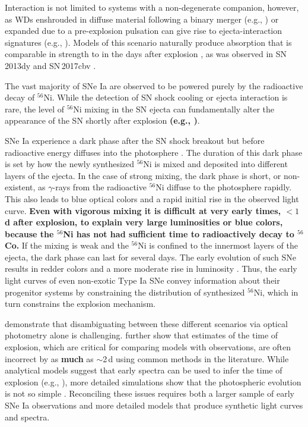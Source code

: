 \documentclass[twocolumn]{aastex61}
\begin{document}
Interaction is not limited to systems with a non-degenerate companion,
however, as WDs enshrouded in diffuse material following a binary merger
(e.g., \citealt{2015MNRAS.447.2803L}) or expanded due to a pre-explosion
pulsation can give rise to ejecta-interaction signatures (e.g.,
\citealt{2014MNRAS.441..532D}). Models of this scenario naturally produce
 absorption that is comparable in strength to  in the
days after explosion \citep{2014MNRAS.441..532D}, as was observed in
SN\,2013dy \citep{2013ApJ...778L..15Z} and SN\,2017cbv
\citep{2017ApJ...845L..11H}.

The vast majority of SNe Ia are observed to be powered purely by the
radioactive decay of $^{56}$Ni. While the detection of SN shock cooling or
ejecta interaction is rare, the level of $^{56}$Ni mixing in the SN ejecta can
fundamentally alter the appearance of the SN shortly after explosion
\textbf{(e.g.,
\citealt{2014MNRAS.441..532D,2016ApJ...826...96P,2017MNRAS.466.3784S,2017MNRAS.472.2787N})}. 

SNe Ia experience a dark phase after the SN shock breakout but before
radioactive energy diffuses into the photosphere \citep{2014ApJ...784...85P}.
The duration of this dark phase is set by how the newly synthesized $^{56}$Ni
is mixed and deposited into different layers of the ejecta. In the case of
strong mixing, the dark phase is short, or non-existent, as $\gamma$-rays from
the radioactive $^{56}$Ni diffuse to the photosphere rapidly. This also leads
to blue optical colors and a rapid initial rise in the observed light curve.
\textbf{Even with vigorous mixing it is difficult at very early times, $<
1$\,d after explosion, to explain very large luminosities or blue colors,
because the $^{56}$Ni has not had sufficient time to radioactively decay to
$^{56}$Co.} If the mixing is weak and the $^{56}$Ni is confined to the
innermost layers of the ejecta, the dark phase can last for several days. The
early evolution of such SNe results in redder colors and a more moderate rise
in luminosity \citep{2014MNRAS.441..532D,2016ApJ...826...96P}. Thus, the early
light curves of even non-exotic Type Ia SNe convey information about their
progenitor systems by constraining the distribution of synthesized $^{56}$Ni,
which in turn constrains the explosion mechanism.


\citet{2017MNRAS.472.2787N} demonstrate that disambiguating between these different scenarios via optical photometry alone is challenging. \citeauthor{2017MNRAS.472.2787N} further show that estimates of the time of explosion, which are critical for comparing models with observations, are often incorrect by as \textbf{much} as $\sim$2\,d using common methods in the literature. While analytical models suggest that early spectra can be used to infer the time of explosion (e.g., \citealt{2014ApJ...784...85P}), more detailed simulations show that the photospheric evolution is not so simple \citep{2016ApJ...826...96P}. Reconciling these issues requires both a larger sample of early SNe Ia observations and more detailed models that produce synthetic light curves and spectra.
\end{document}
